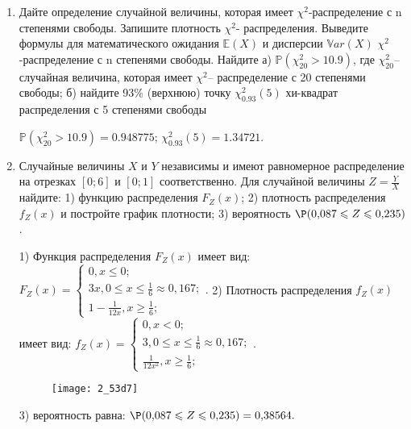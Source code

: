 \documentclass[a4paper,12pt]{article}
\begin{document}
\begin{enumerate}


\item


Дайте определение случайной величины, которая имеет $\chi ^{2}$-распределение с n степенями свободы.
Запишите плотность $\chi ^{2}$- распределения. Выведите формулы для математического ожидания $\mathbb{E}(X)$ и дисперсии $\mathbb{V}ar(X)$ $\chi ^{2}$-распределение с n степенями свободы. Найдите а) $\mathbb{P}(\chi _{20}^{2} > 10.9)$, где $\chi _{20}^{2}$–случайная величина, которая имеет $\chi ^{2}$– распределение с 20 степенями свободы; б) найдите 93\%
(верхнюю) точку $\chi _{0.93}^{2} (5)$ хи-квадрат распределения с 5 степенями свободы




$\mathbb{P}(\chi _{20}^{2} > 10.9) =  0.948775$; $\chi _{0.93}^{2} (5) = 1.34721$.


\item



Случайные величины $X$ и $Y$ независимы и имеют равномерное
распределение на отрезках $[0;6]$ и $[0;1]$ соответственно. Для случайной величины $Z=\frac{Y}{X}$ найдите: 
1) функцию распределения $F_Z(x)$;
2) плотность распределения $f_Z(x)$ и постройте график плотности;
3) вероятность $\P(0,\!087\leqslant Z\leqslant 0,\!235)$.




1) Функция распределения $F_Z(x)$ имеет вид:
$
F_Z(x)=\left\{
\begin{array}{l}
0, x\leqslant 0;\\
3 x, 0\leqslant x\leqslant \frac{1}{6}\approx 0,\!167;\\
1 - \frac{1}{12 x}, x\geqslant\frac{1}{6};
\end{array}.
\right.
$
2) Плотность распределения $f_Z(x)$ имеет вид:
$
f_Z(x)=\left\{
\begin{array}{l}
0, x<0;\\
3, 0\leqslant x\leqslant \frac{1}{6}\approx 0,\!167;\\
\frac{1}{12 x^{2}}, x\geqslant\frac{1}{6};
\end{array}.
\right.
$


\begin{figure}[H]
    \texttt{[image: 2\_53d7]}
\end{figure}


3) вероятность равна:
$
\P(0,\!087\leqslant Z\leqslant 0,\!235)=
0,\!38564.
$



\end{enumerate}
\end{document}
